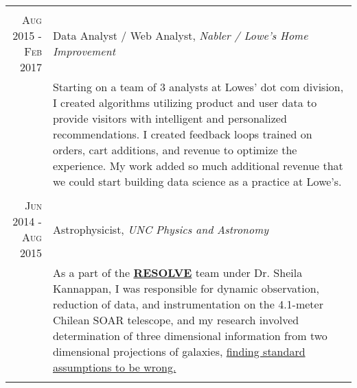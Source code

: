 \documentclass[a4paper,10pt]{article} %
\begin{document}
\begin{tabular}{r|p{11cm}}
\multicolumn{2}{c}{} \\


\textsc{Aug 2015 - Feb 2017} &  Data Analyst / Web Analyst, \emph{Nabler / Lowe's Home Improvement} \\
& \footnotesize{Starting on a team of 3 analysts at Lowes' dot com division, I created algorithms utilizing product and user data to provide visitors with intelligent and personalized recommendations. I created feedback loops trained on orders, cart additions, and revenue to optimize the experience. My work added so much additional revenue that we could start building data science as a practice at Lowe's.}\\

\multicolumn{2}{c}{} \\


\textsc{Jun 2014 - Aug 2015} & Astrophysicist, \emph{UNC Physics and Astronomy} \\ 
& \footnotesize{As a part of the \textbf{\href{http://resolve.astro.unc.edu/}{RESOLVE}} team under Dr. Sheila Kannappan, I was responsible for dynamic observation, reduction of data, and instrumentation on the 4.1-meter Chilean SOAR telescope, and my research involved determination of three dimensional information from two dimensional projections of galaxies, \href{https://ui.adsabs.harvard.edu/abs/2015AAS...22533611B/abstract}{finding standard assumptions to be wrong.}}\\
\multicolumn{2}{c}{} \\



\end{tabular}
\end{document}
